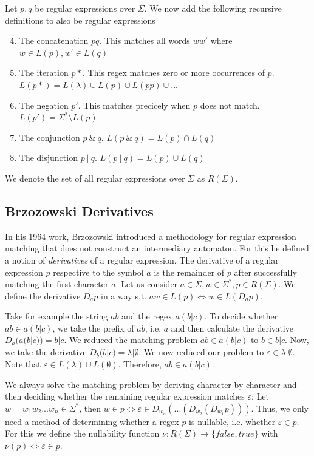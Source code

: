 Let $p, q$ be regular expressions over $\Sigma$. We now add the following recursive definitions to also be regular expressions

\begin{enumerate}
    \setcounter{enumi}{3}
    \item The concatenation $pq$. This matches all words $ww'$ where $w \in L(p), w' \in L(q) $
    \item The iteration $p*$. This regex matches zero or more occurrences of $p$. $L(p*) = L(\lambda) \cup L(p) \cup L(pp) \cup ...$
    \item The negation $p'$. This matches precicely when $p$ does not match. $L(p') = \Sigma^* \setminus L(p)$
    \item The conjunction $p\:\&\:q$. $L(p\:\&\:q) = L(p) \cap L(q)$
    \item The disjunction $p\:|\:q$. $L(p\:|\:q) = L(p) \cup L(q)$
\end{enumerate}

We denote the set of all regular expressions over $\Sigma$ as $R(\Sigma)$.


\subsection{Brzozowski Derivatives}
In his 1964 work, Brzozowski \cite{brzozowski} introduced a methodology for regular expression matching that does not construct an intermediary automaton. For this he defined a notion of \textit{derivatives} of a regular expression. The derivative of a regular expression $p$ respective to the symbol $a$ is the remainder of $p$ after successfully matching the first character $a$. Let us consider $a \in \Sigma, w \in \Sigma^*, p \in R(\Sigma)$. We define the derivative $D_ap$ in a way s.t. $aw \in L(p) \Leftrightarrow w \in L(D_ap)$.

Take for example the string $ab$ and the regex $a(b|c)$. To decide whether $ab \in a(b|c)$, we take the prefix of $ab$, i.e. $a$ and then calculate the derivative $D_a(a(b|c)) = b|c$. We reduced the matching problem $ab \in a(b|c)$ to $b \in b|c$. Now, we take the derivative $D_b(b|c) = \lambda|\emptyset$. We now reduced our problem to $\varepsilon \in \lambda|\emptyset$. Note that $\varepsilon \in L(\lambda) \cup L(\emptyset)$. Therefore, $ab \in a(b|c)$.

We always solve the matching problem by deriving character-by-character and then deciding whether the remaining regular expression matches $\varepsilon$:
Let $w = w_1w_2...w_n \in \Sigma^*$, then $w \in p \Leftrightarrow \varepsilon \in D_{w_n}(...(D_{w_2}(D_{w_1}p)))$. Thus, we only need a method of determining whether a regex $p$ is nullable, i.e. whether $\varepsilon \in p$. For this we define the nullability function $\nu: R(\Sigma) \rightarrow \{false, true\}$ with $\nu(p) \Leftrightarrow \varepsilon \in p$.

